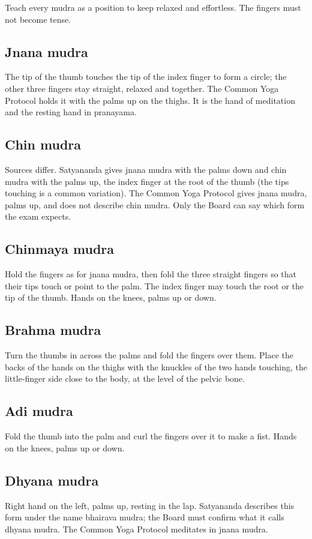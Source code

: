 Teach every mudra as a position to keep relaxed and effortless. The fingers must not become tense.

\subsection*{Jnana mudra}
The tip of the thumb touches the tip of the index finger to form a circle; the other three fingers stay straight, relaxed and together. The Common Yoga Protocol holds it with the palms up on the thighs. It is the hand of meditation and the resting hand in pranayama.

\subsection*{Chin mudra}
Sources differ. Satyananda gives jnana mudra with the palms down and chin mudra with the palms up, the index finger at the root of the thumb (the tips touching is a common variation). The Common Yoga Protocol gives jnana mudra, palms up, and does not describe chin mudra. Only the Board can say which form the exam expects.

\subsection*{Chinmaya mudra}
Hold the fingers as for jnana mudra, then fold the three straight fingers so that their tips touch or point to the palm. The index finger may touch the root or the tip of the thumb. Hands on the knees, palms up or down.

\subsection*{Brahma mudra}
Turn the thumbs in across the palms and fold the fingers over them. Place the backs of the hands on the thighs with the knuckles of the two hands touching, the little-finger side close to the body, at the level of the pelvic bone.

\subsection*{Adi mudra}
Fold the thumb into the palm and curl the fingers over it to make a fist. Hands on the knees, palms up or down.

\subsection*{Dhyana mudra}
Right hand on the left, palms up, resting in the lap. Satyananda describes this form under the name bhairava mudra; the Board must confirm what it calls dhyana mudra. The Common Yoga Protocol meditates in jnana mudra.

